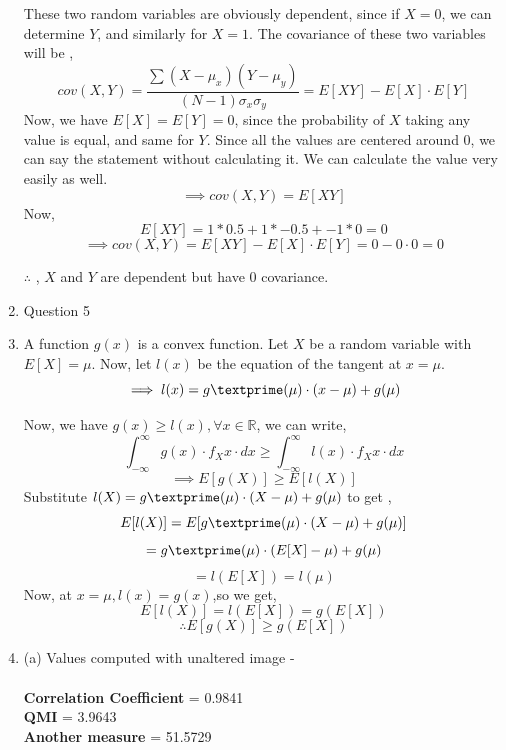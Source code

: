 \documentclass[11pt]{article}
\begin{document}
\begin{enumerate}
{		These two random variables are obviously dependent, since if $X=0$, we can determine $Y$, and similarly for $X=1$.
		The covariance of these two variables will be ,
		$$cov(X,Y) = \frac{ \sum{(X-\mu_x)(Y-\mu_y)}}{(N-1)\sigma_x\sigma_y} = E[XY]-E[X]\cdot E[Y] $$
		Now, we have $E[X] = E[Y] = 0$, since the probability of $X$ taking any value is equal, and same for $Y$. Since all the values are centered around 0, we can say the statement without calculating it. We can calculate the value very easily as well. 
		$$\implies cov(X,Y) = E[XY] $$
		Now,
		$$ E[XY] = 1*0.5 + 1*-0.5 + -1*0  = 0 $$
		$$ \implies cov(X,Y) = E[XY] - E[X]\cdot E[Y] = 0-0\cdot0 = 0$$
		\begin{center}
			$\therefore$ , $X$ and $Y$ are dependent but have 0 covariance.
		\end{center}
	}

	\item{
		Question 5
	}

	\item{
		A function $g(x)$ is a convex function.
		Let $X$ be a random variable with $E[X]=\mu$. 
		Now, let $l(x)$ be the equation of the tangent at $x=\mu$.
		$$\implies l(x) = g\textprime(\mu)\cdot(x-\mu) + g(\mu)$$

		Now, we have $g(x) \geq l(x) ,\forall x \in \mathbb{R} $, we can write, 
		$$\int_{-\infty}^{\infty}{g(x)\cdot f_X{x}\cdot dx} \geq \int_{-\infty}^{\infty}{l(x)\cdot f_X{x}\cdot dx} $$
		$$\implies E[g(X)] \geq E[l(X)]$$
		Substitute $l(X) = g\textprime(\mu)\cdot(X-\mu) + g(\mu)$ to get ,
		$$E[l(X)] = E[g\textprime(\mu)\cdot(X-\mu) + g(\mu)]$$
		$$ = g\textprime(\mu)\cdot(E[X]-\mu) + g(\mu)$$
		$$ = l(E[X]) = l(\mu)$$
		Now, at $x=\mu, l(x) = g(x)$,so we get,
		$$E[l(X)] = l(E[X]) = g(E[X]) $$
		$$ \therefore E[g(X)] \geq g(E[X]) $$
	}

	\item{
		(a) Values computed with unaltered image - \\ \\
		\textbf{Correlation Coefficient} = 0.9841 \\
		\textbf{QMI} = 3.9643 \\
		\textbf{Another measure} = 51.5729

}
\end{enumerate}
\end{document}
